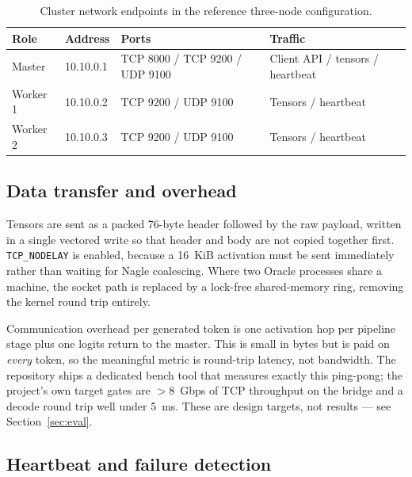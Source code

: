 \documentclass[11pt,a4paper]{article}
\begin{document}
\begin{table}[h]
\centering
\caption{Cluster network endpoints in the reference three-node configuration.}
\label{tab:net}
\footnotesize
\begin{tabular}{@{}llll@{}}
\toprule
\textbf{Role} & \textbf{Address} & \textbf{Ports} & \textbf{Traffic} \\
\midrule
Master   & 10.10.0.1 & TCP 8000 / TCP 9200 / UDP 9100 & Client API / tensors / heartbeat \\
Worker 1 & 10.10.0.2 & TCP 9200 / UDP 9100            & Tensors / heartbeat \\
Worker 2 & 10.10.0.3 & TCP 9200 / UDP 9100            & Tensors / heartbeat \\
\bottomrule
\end{tabular}
\end{table}

\subsection{Data transfer and overhead}

Tensors are sent as a packed 76-byte header followed by the raw payload, written
in a single vectored write so that header and body are not copied together first.
\texttt{TCP\_NODELAY} is enabled, because a 16~KiB activation must be sent
immediately rather than waiting for Nagle coalescing. Where two Oracle processes
share a machine, the socket path is replaced by a lock-free shared-memory ring,
removing the kernel round trip entirely.

Communication overhead per generated token is one activation hop per pipeline
stage plus one logits return to the master. This is small in bytes but is paid on
\emph{every} token, so the meaningful metric is round-trip latency, not
bandwidth. The repository ships a dedicated bench tool that measures exactly this
ping-pong; the project's own target gates are $>8$~Gbps of TCP throughput on the
bridge and a decode round trip well under 5~ms. These are design targets, not
results --- see Section~\ref{sec:eval}.

\subsection{Heartbeat and failure detection}
\end{document}
